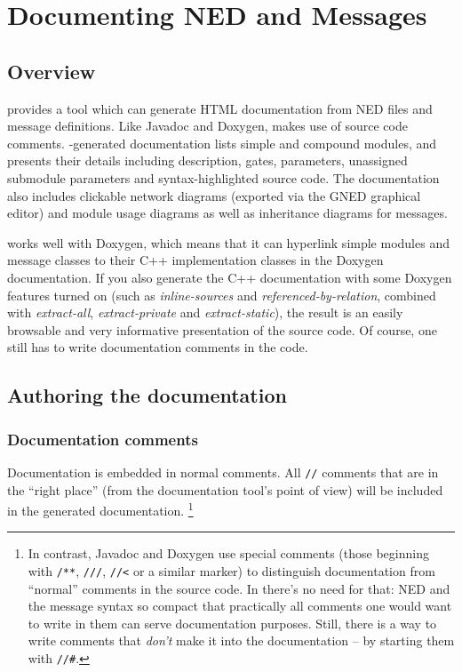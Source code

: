 \chapter{Documenting NED and Messages}
\label{cha:neddoc}

\section{Overview}

{\opp} provides a tool which can generate HTML documentation from NED files
and message definitions. Like Javadoc and Doxygen, 
makes use of source code comments. -generated
documentation lists simple and compound modules, and presents their details
including description, gates, parameters, unassigned submodule parameters
and syntax-highlighted source code.
The documentation also includes clickable network diagrams (exported via the GNED
graphical editor) and module usage diagrams as well as inheritance diagrams
for messages.

 works well with Doxygen, which means that it can hyperlink
simple modules and message classes to their C++ implementation classes in
the Doxygen documentation. If you also generate the C++ documentation with some
Doxygen features turned on (such as \textit{inline-sources} and
\textit{referenced-by-relation}, combined with
\textit{extract-all}, \textit{extract-private} and \textit{extract-static}),
the result is an easily browsable and very informative presentation of the
source code. Of course, one still has to write documentation comments
in the code.



\section{Authoring the documentation}


\subsection{Documentation comments}

Documentation is embedded in normal comments. All \texttt{//} comments
that are in the ``right place'' (from the documentation tool's
point of view) will be included in the generated documentation.
  \footnote{In contrast, Javadoc and Doxygen use special comments (those
     beginning with \texttt{/**}, \texttt{///}, \texttt{//<} or a similar
     marker) to distinguish documentation from ``normal'' comments in the
     source code. In {\opp} there's no need for that: NED and the message
     syntax so compact that practically all comments one would want to write
     in them can serve documentation purposes. Still, there is a way to write
     comments that \textit{don't} make it into the documentation -- by starting
     them with \texttt{//\#}.}

